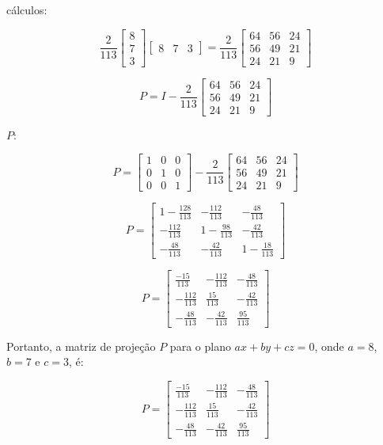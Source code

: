  cálculos:

\[ \frac{2}{113} \begin{bmatrix} 8 \\ 7 \\ 3 \end{bmatrix} \begin{bmatrix} 8 & 7 & 3 \end{bmatrix} = \frac{2}{113} \begin{bmatrix} 64 & 56 & 24 \\ 56 & 49 & 21 \\ 24 & 21 & 9 \end{bmatrix} \]

\[ P = I - \frac{2}{113} \begin{bmatrix} 64 & 56 & 24 \\ 56 & 49 & 21 \\ 24 & 21 & 9 \end{bmatrix} \]

 \( P \):

\[ P = \begin{bmatrix} 1 & 0 & 0 \\ 0 & 1 & 0 \\ 0 & 0 & 1 \end{bmatrix} - \frac{2}{113} \begin{bmatrix} 64 & 56 & 24 \\ 56 & 49 & 21 \\ 24 & 21 & 9 \end{bmatrix} \]

\[ P = \begin{bmatrix} 1 - \frac{128}{113} & -\frac{112}{113} & -\frac{48}{113} \\ -\frac{112}{113} & 1 - \frac{98}{113} & -\frac{42}{113} \\ -\frac{48}{113} & -\frac{42}{113} & 1 - \frac{18}{113} \end{bmatrix} \]

\[ P = \begin{bmatrix} \frac{-15}{113} & -\frac{112}{113} & -\frac{48}{113} \\ -\frac{112}{113} & \frac{15}{113} & -\frac{42}{113} \\ -\frac{48}{113} & -\frac{42}{113} & \frac{95}{113} \end{bmatrix} \]

Portanto, a matriz de projeção \( P \) para o plano \( ax + by + cz = 0 \), onde \( a = 8 \), \( b = 7 \) e \( c = 3 \), é:

\[ P = \begin{bmatrix} \frac{-15}{113} & -\frac{112}{113} & -\frac{48}{113} \\ -\frac{112}{113} & \frac{15}{113} & -\frac{42}{113} \\ -\frac{48}{113} & -\frac{42}{113} & \frac{95}{113} \end{bmatrix} \]

